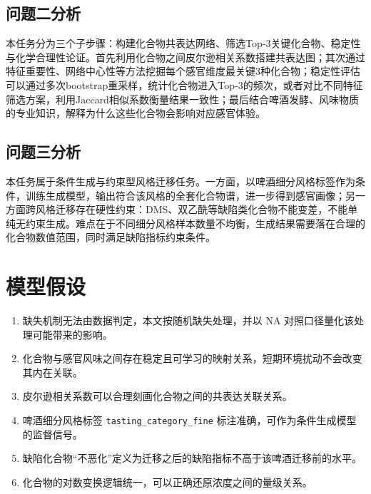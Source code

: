 \documentclass[12pt,a4paper]{article}
\begin{document}
\subsection{问题二分析}
本任务分为三个子步骤：构建化合物共表达网络、筛选Top‑3关键化合物、稳定性与化学合理性论证。首先利用化合物之间皮尔逊相关系数搭建共表达图；其次通过特征重要性、网络中心性等方法挖掘每个感官维度最关键3种化合物；稳定性评估可以通过多次bootstrap重采样，统计化合物进入Top‑3的频次，或者对比不同特征筛选方案，利用Jaccard相似系数衡量结果一致性；最后结合啤酒发酵、风味物质的专业知识，解释为什么这些化合物会影响对应感官体验。

\subsection{问题三分析}
本任务属于条件生成与约束型风格迁移任务。一方面，以啤酒细分风格标签作为条件，训练生成模型，输出符合该风格的全套化合物谱，进一步得到感官画像；另一方面跨风格迁移存在硬性约束：DMS、双乙酰等缺陷类化合物不能变差，不能单纯无约束生成。难点在于不同细分风格样本数量不均衡，生成结果需要落在合理的化合物数值范围，同时满足缺陷指标约束条件。

\section{模型假设}
\begin{enumerate}[label=\arabic*.,leftmargin=2.5em]
    \item 缺失机制无法由数据判定，本文按随机缺失处理，并以 NA 对照口径量化该处理可能带来的影响。
    \item 化合物与感官风味之间存在稳定且可学习的映射关系，短期环境扰动不会改变其内在关联。
    \item 皮尔逊相关系数可以合理刻画化合物之间的共表达关联关系。
    \item 啤酒细分风格标签 \texttt{tasting\_category\_fine} 标注准确，可作为条件生成模型的监督信号。
    \item 缺陷化合物``不恶化''定义为迁移之后的缺陷指标不高于该啤酒迁移前的水平。
    \item 化合物的对数变换逻辑统一，可以正确还原浓度之间的量级关系。
\end{enumerate}

\end{document}
